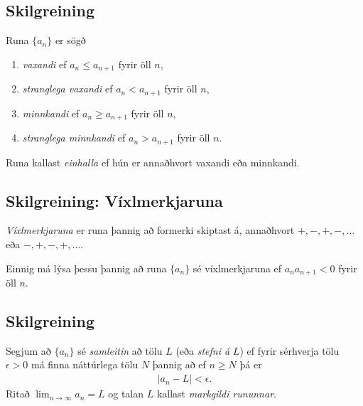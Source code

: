 \documentclass[a4paper,10pt,icelandic]{sphinxmanual}
\begin{document}
\subsection{Skilgreining}
\label{kafli09:index-2}\label{kafli09:id1}
Runa \(\{a_n\}\) er sögð
\begin{enumerate}
\item {} 
\emph{vaxandi} ef \(a_n\leq a_{n+1}\) fyrir öll \(n\),

\item {} 
\emph{stranglega vaxandi} ef \(a_n< a_{n+1}\) fyrir öll \(n\),

\item {} 
\emph{minnkandi} ef \(a_n\geq a_{n+1}\) fyrir öll \(n\),

\item {} 
\emph{stranglega minnkandi} ef \(a_n> a_{n+1}\) fyrir öll
\(n\).

\end{enumerate}

Runa kallast \emph{einhalla} ef hún er annaðhvort vaxandi eða minnkandi.


\subsection{Skilgreining: Víxlmerkjaruna}
\label{kafli09:skilgreining-vixlmerkjaruna}\label{kafli09:index-3}
\emph{Víxlmerkjaruna} er runa þannig að formerki skiptast á, annaðhvort
\(+, -, +, -, \ldots\) eða \(-, +, -, +, \ldots\).

Einnig má lýsa þessu þannig að runa \(\{a_n\}\) sé víxlmerkjaruna ef
\(a_na_{n+1}<0\) fyrir öll \(n\).


\subsection{Skilgreining}
\label{kafli09:id2}\label{kafli09:index-4}
Segjum að \(\{a_n\}\) sé \emph{samleitin} að tölu \(L\) (eða \emph{stefni
á} \(L\)) ef fyrir sérhverja tölu \(\epsilon>0\) má finna
náttúrlega tölu \(N\) þannig að ef \(n\geq N\) þá er
\begin{equation*}
\begin{split}|a_n-L|<\epsilon.\end{split}
\end{equation*}
Ritað \(\lim_{n\rightarrow \infty}a_n=L\) og talan \(L\) kallast
\emph{markgildi rununnar}.
\end{document}
